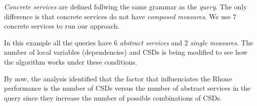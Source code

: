 \textit{Concrete services} are defined follwing the same grammar as the
\textit{query}. The only difference is that concrete services do not have
\textit{composed measures}. We use 7 concrete services to run our approach.

In this example all the queries have 6 \textit{abstract services} and 2
\textit{single measures}. The number of local variables (dependencies) and CSDs
is being modified to see how the algorithm works under these conditions.   

By now, the analysis identified that the factor that influenciates the Rhone
performance is the number of CSDs versus the number of abstract services in the
query since they increase the number of possible combinations of CSDs.   




